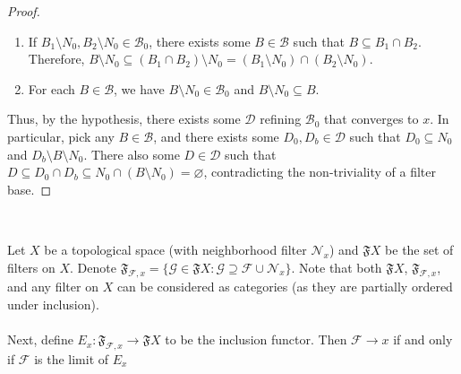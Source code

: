 \documentclass{treatise}
\begin{document}
\begin{proof}
\begin{enumerate}
    \item If $B_1 \setminus N_0, B_2 \setminus N_0 \in \mathcal{B}_0$, there exists some $B \in \mathcal{B}$ such that $B \subseteq B_1 \cap B_2$. Therefore, $B \setminus N_0 \subseteq (B_1 \cap B_2) \setminus N_0 = (B_1 \setminus N_0) \cap (B_2 \setminus N_0)$.
    \item For each $B \in \mathcal{B}$, we have $B \setminus N_0 \in \mathcal{B}_0$ and $B \setminus N_0 \subseteq B$.
\end{enumerate}
Thus, by the hypothesis, there exists some $\mathcal{D}$ refining $\mathcal{B}_0$ that converges to $x$. In particular, pick any $B \in \mathcal{B}$, and there exists some $D_0, D_b \in \mathcal{D}$ such that $D_0 \subseteq N_0$ and $D_b \setminus B \setminus N_0$. There also some $D \in \mathcal{D}$ such that $D \subseteq D_0 \cap D_b \subseteq N_0 \cap (B \setminus N_0) = \varnothing$, contradicting the non-triviality of a filter base.
\end{proof}
\ 
\\
\begin{theorem}
Let $X$ be a topological space (with neighborhood filter $\mathcal{N}_x$) and $\mathfrak{F}X$ be the set of filters on $X$. Denote $\mathfrak{F}_{\mathcal{F}, x} = \{ \mathcal{G} \in \mathfrak{F}X : \mathcal{G} \supseteq \mathcal{F} \cup \mathcal{N}_x \}$. Note that both $\mathfrak{F}X$, $\mathfrak{F}_{\mathcal{F}, x}$, and any filter on $X$ can be considered as categories (as they are partially ordered under inclusion).
\\
\\
Next, define $E_x: \mathfrak{F}_{\mathcal{F}, x} \to \mathfrak{F}X$ to be the inclusion functor. Then $\mathcal{F} \to x$ if and only if $\mathcal{F}$ is the limit of $E_x$
\end{theorem}
\end{document}
